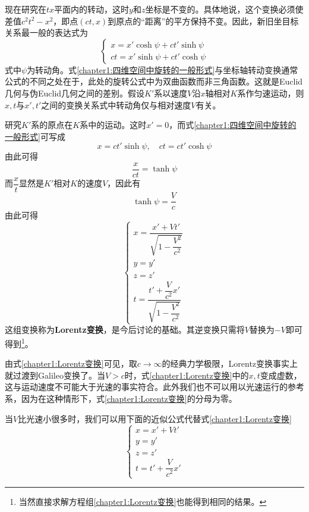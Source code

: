现在研究在$tx$平面内的转动，这时$y$和$z$坐标是不变的。具体地说，这个变换必须使差值$c^2t^2-x^2$，即点$(ct,x)$到原点的“距离”的平方保持不变。因此，新旧坐目标关系最一般的表达式为
\begin{equation}
\begin{cases}
	x = x'\cosh \psi + ct' \sinh \psi \\
	ct = x'\sinh \psi + ct' \cosh \psi
\end{cases}
\label{chapter1:四维空间中旋转的一般形式}
\end{equation}
式中$\psi$为转动角。式\eqref{chapter1:四维空间中旋转的一般形式}与坐标轴转动变换通常公式的不同之处在于，此处的旋转公式中为双曲函数而非三角函数。这就是Euclid几何与伪Euclid几何之间的差别。假设$K'$系以速度$V$沿$x$轴相对$K$系作匀速运动，则$x,t$与$x',t'$之间的变换关系式中转动角仅与相对速度$V$有关。

研究$K'$系的原点在$K$系中的运动。这时$x'=0$，而式\eqref{chapter1:四维空间中旋转的一般形式}可写成
\begin{equation*}
	x = ct'\sinh \psi,\quad ct = ct'\cosh \psi
\end{equation*}
由此可得
\begin{equation*}
	\frac{x}{ct} = \tanh \psi
\end{equation*}
而$\dfrac{x}{t}$显然是$K'$相对$K$的速度$V$，因此有
\begin{equation*}
	\tanh \psi = \frac{V}{c}
\end{equation*}
由此可得
\begin{equation}
\begin{cases}
	x = \dfrac{x'+Vt'}{\sqrt{1-\dfrac{V^2}{c^2}}} \\
	y = y' \\
	z = z' \\
	t = \dfrac{t'+\dfrac{V}{c^2}x'}{\sqrt{1-\dfrac{V^2}{c^2}}}
\end{cases}
\label{chapter1:Lorentz变换}
\end{equation}
这组变换称为{\bf Lorentz变换}，是今后讨论的基础。其逆变换只需将$V$替换为$-V$即可得到\footnote{当然直接求解方程组\eqref{chapter1:Lorentz变换}也能得到相同的结果。}。

由式\eqref{chapter1:Lorentz变换}可见，取$c\to\infty$的经典力学极限，Lorentz变换事实上就过渡到Galileo变换了。当$V>c$时，式\eqref{chapter1:Lorentz变换}中的$x,t$变成虚数，这与运动速度不可能大于光速的事实符合。此外我们也不可以用以光速运行的参考系，因为在这种情形下，式\eqref{chapter1:Lorentz变换}的分母为零。

当$V$比光速小很多时，我们可以用下面的近似公式代替式\eqref{chapter1:Lorentz变换}
\begin{equation}
\begin{cases}
	x = x'+Vt' \\
	y = y' \\
	z = z' \\
	t = t'+\dfrac{V}{c^2}x'
\end{cases}
\label{chapter1:近似的Lorentz变换}
\end{equation}

